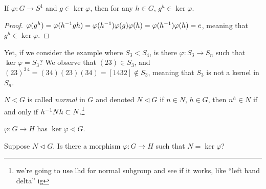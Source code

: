 \begin{claim}
    If $\varphi : G \to S^1$ and $g \in \ker \varphi$, then for any $h \in G$, $g^h \in \ker \varphi$.
\end{claim}
\begin{proof}
    $\varphi(g^h) = \varphi(h^{-1} g h) = \varphi(h ^{-1}) \varphi(g) \varphi(h) = \varphi(h ^{-1}) \varphi(h) = e$, meaning that $g^h \in \ker \varphi$.
\end{proof}
\noindent Yet, if we consider the example where $S_3 < S_4$, is there $\varphi : S_3 \to S_n$ such that $\ker \varphi = S_3$? We observe that $(2 3) \in S_3$, and $(2 3)^{3 \, 4} = (3 4)(2 3)(3 4) = [1 4 3 2] \not\in S_3$, meaning that $S_3$ is not a kernel in $S_n$.
\begin{definition}
    $N < G$ is called \textit{normal} in $G$ and denoted $N \lhd G$ if $n \in N$, $h \in G$, then $n^h \in N$ if and only if $h ^{-1} N h \subset N$.\footnote{we're going to use lhd for normal subgroup and see if it works, like ``left hand delta'' ig}
\end{definition}
\begin{claim}
    $\varphi : G \to H$ has $\ker \varphi \lhd G$.
\end{claim}
\noindent Suppose $N \lhd G$. Is there a morphism $\varphi : G \to H$ such that $N = \ker \varphi$?